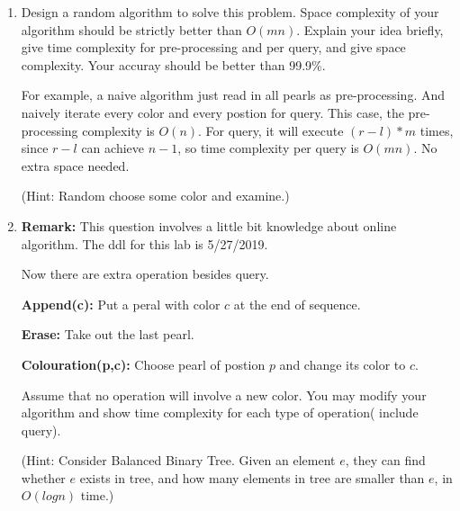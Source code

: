 \documentclass[12pt,a4paper]{article}
\theoremstyle{definition}
\begin{document}
\begin{enumerate}
\begin{enumerate}
\item Design a random algorithm to solve this problem. Space complexity of your algorithm should be strictly better than $O(mn)$. Explain your idea briefly, give time complexity for pre-processing and per query, and give space complexity. Your accuray should be better than 99.9\%. \par
For example, a naive algorithm just read in all pearls as pre-processing. And naively iterate every color and every postion for query. This case, the pre-processing complexity is $O(n)$. For query, it will execute $(r-l)*m$ times, since $r-l$ can achieve $n-1$, so time complexity per query is $O(mn)$. No extra space needed.\par
\color{blue}(Hint: Random choose some color and examine.)\color{black}
\item \textbf{Remark:} This question involves a little bit knowledge about online algorithm. The ddl for this lab is 5/27/2019. \par
Now there are extra operation besides query.\par
\textbf{Append(c):} Put a peral with color $c$ at the end of sequence.\par
\textbf{Erase:} Take out the last pearl.\par
\textbf{Colouration(p,c):} Choose pearl of postion $p$ and change its color to $c$.\par
Assume that no operation will involve a new color. You may modify your algorithm and show time complexity for each type of operation( include query).\par  
\color{blue}(Hint: Consider Balanced Binary Tree. Given an element $e$, they can find whether $e$ exists in tree, and how many elements in tree are smaller than $e$, in $O(logn)$ time.)\color{black}
\end{enumerate} 


\end{enumerate}
\end{document}
